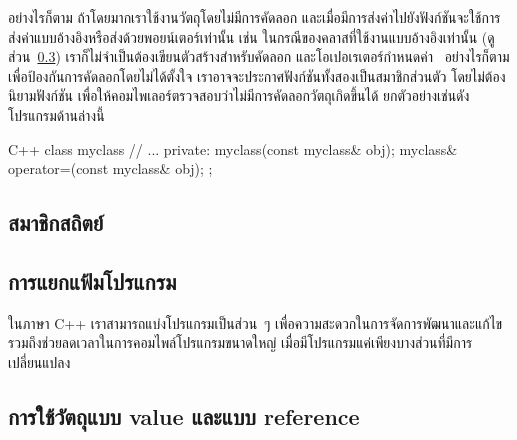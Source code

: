 อย่างไรก็ตาม ถ้า{\wbr}โดยมาก{\wbr}เรา{\wbr}ใช้{\wbr}งาน{\wbr}วัตถุ{\wbr}โดย{\wbr}ไม่{\wbr}มี{\wbr}การ{\wbr}คัดลอก{\wbr}
และ{\wbr}เมื่อ{\wbr}มี{\wbr}การ{\wbr}ส่ง{\wbr}ค่า{\wbr}ไป{\wbr}ยัง{\wbr}ฟังก์ชัน{\wbr}จะ{\wbr}ใช้{\wbr}การ{\wbr}ส่ง{\wbr}ค่า{\wbr}แบบ{\wbr}อ้างอิง{\wbr}หรือ{\wbr}ส่ง{\wbr}ด้วย{\wbr}พอยน์เตอร์{\wbr}เท่านั้น เช่น{\wbr}
ใน{\wbr}กรณี{\wbr}ของ{\wbr}ค{\wbr}ลา{\wbr}ส{\wbr}ที่{\wbr}ใช้{\wbr}งาน{\wbr}แบบ{\wbr}อ้างอิง{\wbr}เท่านั้น{\wbr}
(ดู{\wbr}ส่วน~\ref{section:abs-value-ref-semantics})
เรา{\wbr}ก็{\wbr}ไม่{\wbr}จำเป็น{\wbr}ต้อง{\wbr}เขียน{\wbr}ตัว{\wbr}สร้าง{\wbr}สำหรับ{\wbr}คัดลอก และ{\wbr}โอ{\wbr}เปอเรเตอร์{\wbr}กำหนด{\wbr}ค่า \ อย่างไรก็ตาม{\wbr}
เพื่อ{\wbr}ป้องกัน{\wbr}การ{\wbr}คัดลอก{\wbr}โดย{\wbr}ไม่{\wbr}ได้{\wbr}ตั้งใจ เรา{\wbr}อาจ{\wbr}จะ{\wbr}ประกาศ{\wbr}ฟังก์ชัน{\wbr}ทั้ง{\wbr}สอง{\wbr}เป็น{\wbr}สมาชิก{\wbr}ส่วนตัว{\wbr}
โดย{\wbr}ไม่{\wbr}ต้อง{\wbr}นิยาม{\wbr}ฟังก์ชัน เพื่อให้{\wbr}คอม{\wbr}ไพ{\wbr}เลอร์{\wbr}ตรวจสอบ{\wbr}ว่า{\wbr}ไม่{\wbr}มี{\wbr}การ{\wbr}คัดลอก{\wbr}วัตถุ{\wbr}เกิด{\wbr}ขึ้น{\wbr}ได้{\wbr}
ยก{\wbr}ตัวอย่าง{\wbr}เช่น{\wbr}ดัง{\wbr}โปรแกรม{\wbr}ด้าน{\wbr}ล่าง{\wbr}นี้{\wbr}

\latintext
\begin{codelist}{C++}{}
class myclass {
  // ...
private:
  myclass(const myclass& obj);
  myclass& operator=(const myclass& obj);
};
\end{codelist}
\thaitext

\subsection{สมาชิก{\wbr}สถิตย์}
\label{section:abs-static-member}

\subsection{การ{\wbr}แยก{\wbr}แฟ้ม{\wbr}โปรแกรม}

ใน{\wbr}ภาษา C++ เรา{\wbr}สามารถ{\wbr}แบ่ง{\wbr}โปรแกรม{\wbr}เป็น{\wbr}ส่วน~ๆ
เพื่อ{\wbr}ความ{\wbr}สะดวก{\wbr}ใน{\wbr}การ{\wbr}จัดการ{\wbr}พัฒนา{\wbr}และ{\wbr}แก้ไข{\wbr}
รวม{\wbr}ถึง{\wbr}ช่วย{\wbr}ลด{\wbr}เวลา{\wbr}ใน{\wbr}การ{\wbr}คอมไพล์{\wbr}โปรแกรม{\wbr}ขนาด{\wbr}ใหญ่{\wbr}
เมื่อ{\wbr}มี{\wbr}โปรแกรม{\wbr}แค่{\wbr}เพียง{\wbr}บาง{\wbr}ส่วน{\wbr}ที่{\wbr}มี{\wbr}การ{\wbr}เปลี่ยนแปลง{\wbr}

\subsection{การ{\wbr}ใช้{\wbr}วัตถุ{\wbr}แบบ value และ{\wbr}แบบ reference}
\label{section:abs-value-ref-semantics}

